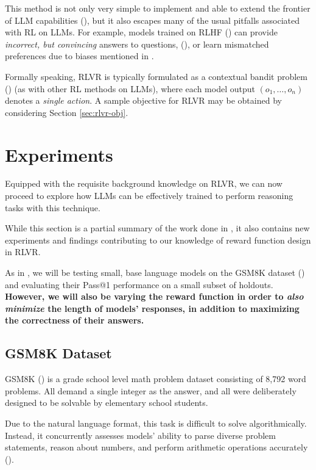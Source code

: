 \documentclass{article} %
\theoremstyle{definition}
\begin{document}
This method is not only very simple to implement and able to extend
the frontier of LLM capabilities (\cite{tulu3, r1}), but it also 
escapes many of the usual pitfalls associated with RL on LLMs. For example, models trained on RLHF (\cite{InstructGPT-2022})
can provide \textit{incorrect, but convincing} answers to questions,
(\cite{Wen-et-al-2024}), or learn mismatched preferences due to biases mentioned in \cite{pitis-2023}.

Formally speaking, RLVR is typically formulated as a contextual bandit problem (\cite{Sutton-and-Barto-1998, contextualbandit})
(as with other RL methods on LLMs), where each model output $(o_1, \dots, o_n)$
denotes a \textit{single action}. A sample objective for RLVR may be obtained 
by considering Section \ref{sec:rlvr-obj}.

\section{Experiments}

Equipped with the requisite background knowledge on RLVR, we can now proceed
to explore how LLMs can be effectively trained to perform reasoning tasks with
this technique.

While this section is a partial summary of the work done in \cite{wk10},
it also contains new experiments and findings contributing to our knowledge
of reward function design in RLVR.

As in \cite{wk10}, we will be testing small, base language models
on the GSM8K dataset (\cite{gsm8k}) and evaluating their Pass@1 performance
on a small subset of holdouts. \textbf{However, we will also be varying the reward function
in order to \textit{also minimize} the length of models' responses, in addition
to maximizing the correctness of their answers.}

\subsection{GSM8K Dataset}

GSM8K (\cite{gsm8k}) is a grade school level math problem dataset consisting
of 8,792 word problems. All demand a single integer as the answer, and all
were deliberately designed to be solvable by elementary school students.

Due to the natural language format, this task is difficult to solve algorithmically.
Instead, it concurrently assesses models' ability to parse diverse problem statements, 
reason about numbers, and perform arithmetic operations accurately (\cite{gsm8k}).
\end{document}
